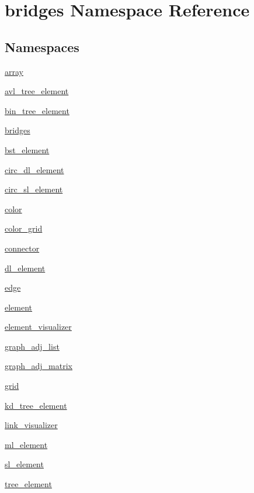 \hypertarget{namespacebridges}{}\section{bridges Namespace Reference}
\label{namespacebridges}
\subsection*{Namespaces}
\begin{DoxyCompactItemize}
\item 
 \hyperlink{namespacebridges_1_1array}{array}
\item 
 \hyperlink{namespacebridges_1_1avl__tree__element}{avl\+\_\+tree\+\_\+element}
\item 
 \hyperlink{namespacebridges_1_1bin__tree__element}{bin\+\_\+tree\+\_\+element}
\item 
 \hyperlink{namespacebridges_1_1bridges}{bridges}
\item 
 \hyperlink{namespacebridges_1_1bst__element}{bst\+\_\+element}
\item 
 \hyperlink{namespacebridges_1_1circ__dl__element}{circ\+\_\+dl\+\_\+element}
\item 
 \hyperlink{namespacebridges_1_1circ__sl__element}{circ\+\_\+sl\+\_\+element}
\item 
 \hyperlink{namespacebridges_1_1color}{color}
\item 
 \hyperlink{namespacebridges_1_1color__grid}{color\+\_\+grid}
\item 
 \hyperlink{namespacebridges_1_1connector}{connector}
\item 
 \hyperlink{namespacebridges_1_1dl__element}{dl\+\_\+element}
\item 
 \hyperlink{namespacebridges_1_1edge}{edge}
\item 
 \hyperlink{namespacebridges_1_1element}{element}
\item 
 \hyperlink{namespacebridges_1_1element__visualizer}{element\+\_\+visualizer}
\item 
 \hyperlink{namespacebridges_1_1graph__adj__list}{graph\+\_\+adj\+\_\+list}
\item 
 \hyperlink{namespacebridges_1_1graph__adj__matrix}{graph\+\_\+adj\+\_\+matrix}
\item 
 \hyperlink{namespacebridges_1_1grid}{grid}
\item 
 \hyperlink{namespacebridges_1_1kd__tree__element}{kd\+\_\+tree\+\_\+element}
\item 
 \hyperlink{namespacebridges_1_1link__visualizer}{link\+\_\+visualizer}
\item 
 \hyperlink{namespacebridges_1_1ml__element}{ml\+\_\+element}
\item 
 \hyperlink{namespacebridges_1_1sl__element}{sl\+\_\+element}
\item 
 \hyperlink{namespacebridges_1_1tree__element}{tree\+\_\+element}
\end{DoxyCompactItemize}
